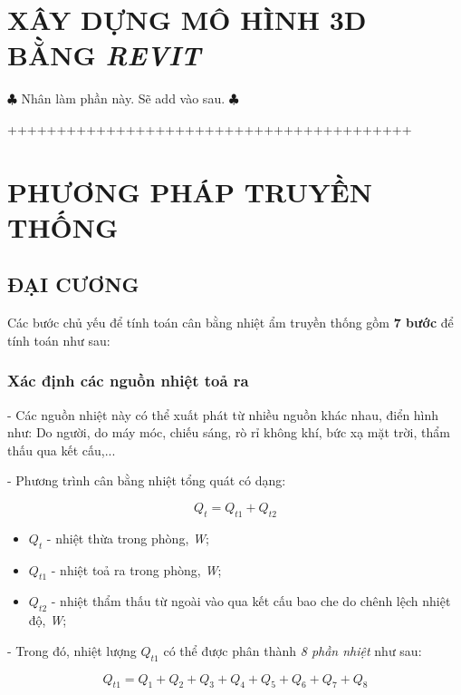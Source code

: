 
\section{XÂY DỰNG MÔ HÌNH 3D BẰNG \emph{REVIT}}
$ \clubsuit $ Nhân làm phần này. Sẽ add vào sau. $ \clubsuit $

+++++++++++++++++++++++++++++++++++++++++

\section{PHƯƠNG PHÁP TRUYỀN THỐNG}
\subsection{ĐẠI CƯƠNG}
Các bước chủ yếu để tính toán cân bằng nhiệt ẩm truyền thống gồm \textbf{7 bước} để tính toán như sau:
\subsubsection{Xác định các nguồn nhiệt toả ra}
- Các nguồn nhiệt này có thể xuất phát từ nhiều nguồn khác nhau, điển hình như: Do người, do máy móc, chiếu sáng, rò rỉ không khí, bức xạ mặt trời, thẩm thấu qua kết cấu,...

- Phương trình cân bằng nhiệt tổng quát có dạng:

\begin{equation}
	Q_{t} = Q_{t1} + Q_{t2}
\end{equation}

\begin{itemize}[leftmargin = 3cm, label = $\star$]
	\item $Q_{t}$ - nhiệt thừa trong phòng, \textit{W};
	\item $Q_{t1}$ - nhiệt toả ra trong phòng, \textit{W};
	\item $Q_{t2}$ - nhiệt thẩm thấu từ ngoài vào qua kết cấu bao che do chênh lệch nhiệt độ, \textit{W};
\end{itemize}


- Trong đó, nhiệt lượng $ Q_{t1} $ có thể được phân thành \textit{8 phần nhiệt} như sau:

\begin{equation}
		Q_{t1} = Q_{1} + Q_{2} + Q_{3} + Q_{4} + Q_{5} + Q_{6} + Q_{7} + Q_{8}
\end{equation}

